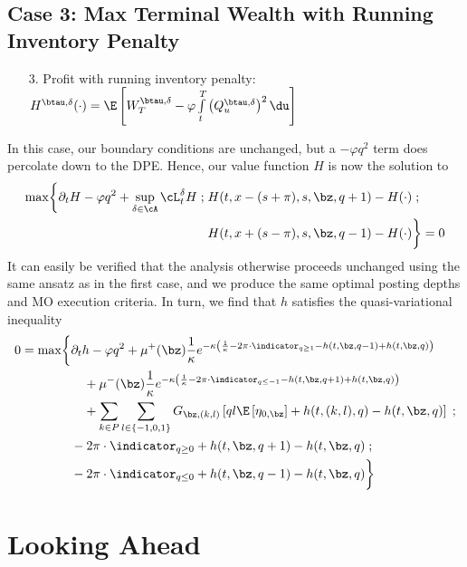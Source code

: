 \documentclass[12pt]{article}
\begin{document}
\subsection*{Case 3: Max Terminal Wealth with Running Inventory Penalty}
\begin{enumerate}[noitemsep, topsep=0pt]
\item[3.] Profit with running inventory penalty: $H^{\btau, \delta}(\cdot) = \E \left[  W_T^{\btau, \delta}  - \varphi \int\limits_t^T \left( Q^{\btau, \delta}_u \right)^2 \du  \right]$
\end{enumerate}
In this case, our boundary conditions are unchanged, but a $-\varphi q^2$ term does percolate down to the DPE. Hence, our value function $H$ is now the solution to
\begin{equation}
\label{eq:DPEcase3}
\begin{split}
\max \biggl\lbrace \partial_t H - \varphi q^2 + \sup \limits_{\delta \in \cA} \cL^{\delta}_t H \; ; \; & H(t,x-(s+\pi), s, \bz, q+1) - H(\cdot) \; ; \\
&  H(t,x+(s-\pi), s, \bz, q-1) - H(\cdot) \biggr\rbrace = 0
\end{split}
\end{equation}
It can easily be verified that the analysis otherwise proceeds unchanged using the same ansatz as in the first case, and we produce the same optimal posting depths and MO execution criteria. In turn, we find that $h$ satisfies the quasi-variational inequality
\begin{equation}\label{eq:PDEcase1}
\begin{split}
0 = \max \biggl\lbrace & \partial_t h -\varphi q^2 + \mu^+(\bz) \frac{1}{\kappa} e^{ -\kappa \left( \frac{1}{\kappa} - 2 \pi \cdot \indicator_{q \geq 1} - h(t,\bz,q-1) + h(t,\bz,q)  \right)} \\
& \quad + \mu^-(\bz) \frac{1}{\kappa} e^{ -\kappa \left( \frac{1}{\kappa} - 2 \pi \cdot \indicator_{q \leq -1} - h(t,\bz,q+1) + h(t,\bz,q) \right)} \\
& \quad + \sum_{k\in P} \sum_{l \in \{-1,0,1\}} G_{\bz,(k,l)} \left[ ql \E \left[ \eta_{0,\bz} \right] + h(t,(k,l),q) - h(t,\bz,q) \right] \; ; \\
& -2 \pi \cdot \indicator_{q \geq 0} + h(t, \bz, q+1) - h(t,\bz,q)   \; ; \\
& -2 \pi \cdot \indicator_{q \leq 0} + h(t, \bz, q-1) - h(t,\bz,q)  \biggr\rbrace
\end{split}
\end{equation}

\section*{Looking Ahead}
\end{document}
